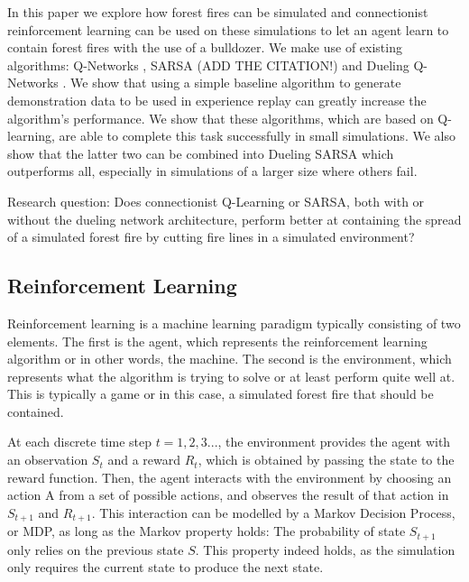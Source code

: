 In this paper we explore how forest fires can be simulated and connectionist reinforcement learning can be used on these simulations to let an agent learn to contain forest fires with the use of a bulldozer. We make use of existing algorithms: Q-Networks \citep{mnih2015human}, SARSA (ADD THE CITATION!) and Dueling Q-Networks \citep{wang2015dueling}. We show that using a simple baseline algorithm to generate demonstration data to be used in experience replay can greatly increase the algorithm's performance. We show that these algorithms, which are based on Q-learning, are able to complete this task successfully in small simulations. We also show that the latter two can be combined into Dueling SARSA which outperforms all, especially in simulations of a larger size where others fail.


Research question: Does connectionist Q-Learning or SARSA, both with or without the dueling network architecture, perform better at containing the spread of a simulated forest fire by cutting fire lines in a simulated environment?

\subsection{Reinforcement Learning}\label{sec:reinforcementlearning}
Reinforcement learning is a machine learning paradigm typically consisting of two elements. The first is the agent, which represents the reinforcement learning algorithm or in other words, the machine. The second is the environment, which represents what the algorithm is trying to solve or at least perform quite well at. This is typically a game or in this case, a simulated forest fire that should be contained.

At each discrete time step $t=1,2,3...$, the environment provides the agent with an observation $S_t$ and a reward $R_t$, which is obtained by passing the state to the reward function. Then, the agent interacts with the environment by choosing an action A from a set of possible actions, and observes the result of that action in $S_{t+1}$ and $R_{t+1}$. This interaction can be modelled by a Markov Decision Process, or MDP, as long as the Markov property holds: The probability of state $S_{t+1}$ only relies on the previous state $S$. This property indeed holds, as the simulation only requires the current state to produce the next state.

